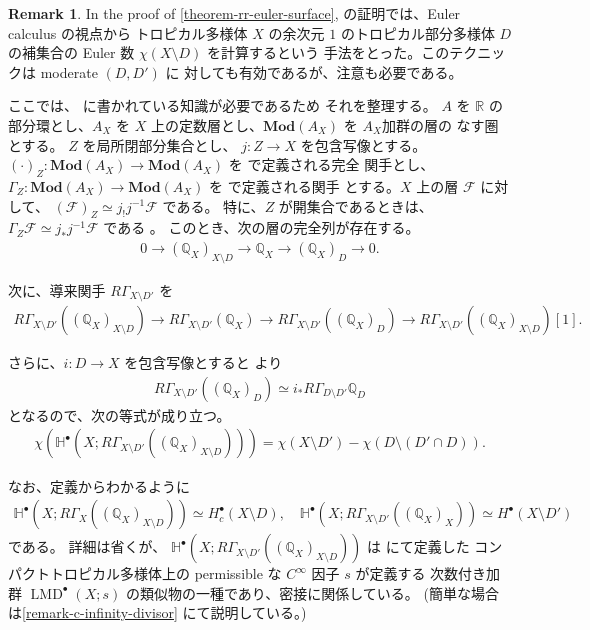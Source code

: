 \documentclass[a4paper,dvipdfmx,reqno,12pt]{amsart}
\theoremstyle{definition}
\newtheorem{remark}[theorem]{Remark}
\newcommand{\opn}[1]{\operatorname{#1}}
\newcommand{\catn}[1]{\mathbf{#1}}
\numberwithin{equation}{section}
\begin{document}
\begin{remark}
In the proof of \cref{theorem-rr-euler-surface}, 
の証明では、Euler calculus の視点から
トロピカル多様体 $X$ の余次元 $1$ のトロピカル部分多様体
$D$ の補集合の Euler 数 $\chi(X\setminus D)$ を計算するという
手法をとった。このテクニックは moderate  $(D,D')$ に
対しても有効であるが、注意も必要である。

ここでは、\cite{MR1299726} に書かれている知識が必要であるため
それを整理する。
$A$ を $\mathbb{R}$ の部分環とし、$A_X$ を
$X$ 上の定数層とし、$\catn{Mod}(A_X)$ を $A_X$加群の層の
なす圏とする。
$Z$ を局所閉部分集合とし、
$j\colon Z\to X$ を包含写像とする。
$(\cdot)_{Z}\colon \catn{Mod}(A_X) \to \catn{Mod}(A_X)$
を \cite[Proposition 2.3.6]{MR1299726} で定義される完全
関手とし、
$\Gamma_{Z}\colon \catn{Mod}(A_X) \to \catn{Mod}(A_X)$
を \cite[Definition 2.3.8]{MR1299726} で定義される関手
とする。$X$ 上の層 $\mathcal{F}$ に対して、
$(\mathcal{F})_{Z}\simeq j_!j^{-1}\mathcal{F}$ である。
特に、$Z$ が開集合であるときは、
$\Gamma_{Z}\mathcal{F}\simeq
j_*j^{-1}\mathcal{F}$ である
\cite[Proposition 2.3.9 (iii)]{MR1299726}。
このとき、次の層の完全列が存在する。
\begin{align}
\label{equation-closed-open-exact}
0 \to (\mathbb{Q}_X)_{X\setminus D}
\to \mathbb{Q}_X \to (\mathbb{Q}_X)_{D} \to 0.
\end{align}

次に、導来関手 $R\Gamma_{X\setminus D'}$ を
\begin{align}
R\Gamma_{X\setminus D'}((\mathbb{Q}_X)_{X\setminus D})
\to  R\Gamma_{X\setminus D'}(\mathbb{Q}_X)
\to R\Gamma_{X\setminus D'}((\mathbb{Q}_X)_D)
\to R\Gamma_{X\setminus D'}((\mathbb{Q}_X)_{X\setminus D})[1].
\end{align}


さらに、$i\colon D\to X$ を包含写像とすると
\cite[(2.3.20)]{MR1299726} より
\begin{align}
R\Gamma_{X\setminus D'}((\mathbb{Q}_X)_D)
\simeq i_* R\Gamma_{D\setminus D'}\mathbb{Q}_D
\end{align}
となるので、次の等式が成り立つ。
\begin{align}
\chi(\mathbb{H}^{\bullet}(X;R\Gamma_{X\setminus D'}((\mathbb{Q}_X)_{X\setminus D})))
= \chi(X\setminus D')
- \chi(D\setminus (D'\cap D)).
\end{align}

なお、定義からわかるように
\begin{align}
\mathbb{H}^{\bullet}(X;R\Gamma_{X}
((\mathbb{Q}_X)_{X\setminus D}))
\simeq H^{\bullet}_c(X\setminus D), \quad
\mathbb{H}^{\bullet}(X;R\Gamma_{X\setminus D'}
((\mathbb{Q}_X)_{X}))
\simeq H^{\bullet}(X\setminus D')
\end{align}
である。
詳細は省くが、
$\mathbb{H}^{\bullet}(X;R\Gamma_{X\setminus D'}
((\mathbb{Q}_X)_{X\setminus D}))$
は \cite{tsutsui2023graded} にて定義した
コンパクトトロピカル多様体上の
permissible な $C^{\infty}$ 因子 $s$ が定義する
次数付き加群 $\opn{LMD}^{\bullet}(X;s)$
の類似物の一種であり、密接に関係している。
(簡単な場合は\cref{remark-c-infinity-divisor}
にて説明している。)




\end{remark}
\end{document}
